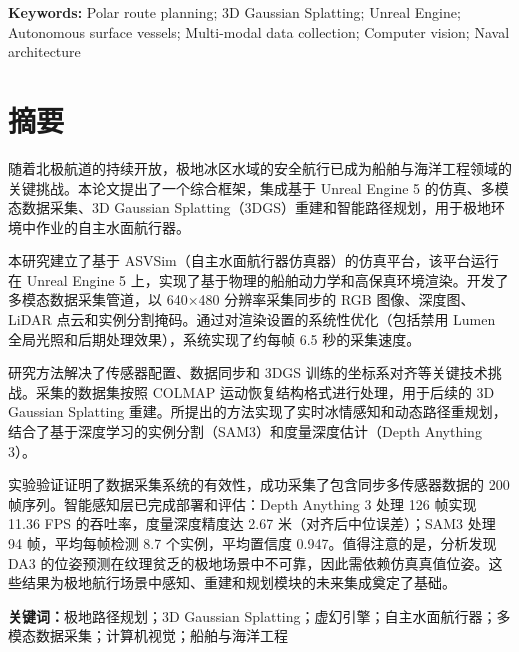 \vspace{1em}
\noindent\textbf{Keywords:} Polar route planning; 3D Gaussian Splatting; Unreal Engine; Autonomous surface vessels; Multi-modal data collection; Computer vision; Naval architecture

\clearpage
\section*{摘\quad 要}

随着北极航道的持续开放，极地冰区水域的安全航行已成为船舶与海洋工程领域的关键挑战。本论文提出了一个综合框架，集成基于 Unreal Engine 5 的仿真、多模态数据采集、3D Gaussian Splatting（3DGS）重建和智能路径规划，用于极地环境中作业的自主水面航行器。

本研究建立了基于 ASVSim（自主水面航行器仿真器）的仿真平台，该平台运行在 Unreal Engine 5 上，实现了基于物理的船舶动力学和高保真环境渲染。开发了多模态数据采集管道，以 640$\times$480 分辨率采集同步的 RGB 图像、深度图、LiDAR 点云和实例分割掩码。通过对渲染设置的系统性优化（包括禁用 Lumen 全局光照和后期处理效果），系统实现了约每帧 6.5 秒的采集速度。

研究方法解决了传感器配置、数据同步和 3DGS 训练的坐标系对齐等关键技术挑战。采集的数据集按照 COLMAP 运动恢复结构格式进行处理，用于后续的 3D Gaussian Splatting 重建。所提出的方法实现了实时冰情感知和动态路径重规划，结合了基于深度学习的实例分割（SAM3）和度量深度估计（Depth Anything 3）。

实验验证证明了数据采集系统的有效性，成功采集了包含同步多传感器数据的 200 帧序列。智能感知层已完成部署和评估：Depth Anything 3 处理 126 帧实现 11.36 FPS 的吞吐率，度量深度精度达 2.67 米（对齐后中位误差）；SAM3 处理 94 帧，平均每帧检测 8.7 个实例，平均置信度 0.947。值得注意的是，分析发现 DA3 的位姿预测在纹理贫乏的极地场景中不可靠，因此需依赖仿真真值位姿。这些结果为极地航行场景中感知、重建和规划模块的未来集成奠定了基础。

\vspace{1em}
\noindent\textbf{关键词：}极地路径规划；3D Gaussian Splatting；虚幻引擎；自主水面航行器；多模态数据采集；计算机视觉；船舶与海洋工程
